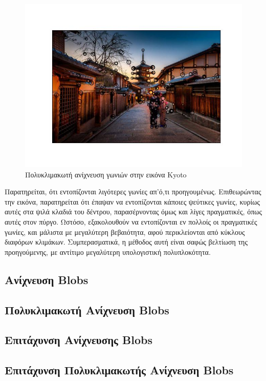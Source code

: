 \documentclass{article}
\newcommand{\eng}[1]{\foreignlanguage{english}{#1}}
\begin{document}
\begin{figure}[h]
    \centering
    \includegraphics[width=\textwidth]{image-plots/corner-detection-multiscale.jpg}
    \caption{Πολυκλιμακωτή ανίχνευση γωνιών στην εικόνα \eng{Kyoto}}
    \label{fig:kyoto-corners-multiscale}
\end{figure}
\FloatBarrier

Παρατηρείται, ότι εντοπίζονται λιγότερες γωνίες απ'ό,τι προηγουμένως. Επιθεωρώντας την εικόνα, παρατηρείται ότι έπαψαν να εντοπίζονται κάποιες ψεύτικες γωνίες, κυρίως αυτές στα ψιλά κλαδιά του δέντρου, παρασέρνοντας όμως και λίγες πραγματικές, όπως αυτές στον πύργο. Ωστόσο, εξακολουθούν να εντοπίζονται εν πολλοίς οι πραγματικές γωνίες, και μάλιστα με μεγαλύτερη βεβαιότητα, αφού περικλείονται από κύκλους διαφόρων κλιμάκων. Συμπερασματικά, η μέθοδος αυτή είναι σαφώς βελτίωση της προηγούμενης, με αντίτιμο μεγαλύτερη υπολογιστική πολυπλοκότητα.


\subsection{Ανίχνευση \eng{Blobs}}

\subsection{Πολυκλιμακωτή Ανίχνευση \eng{Blobs}}

\subsection{Επιτάχυνση Ανίχνευσης \eng{Blobs}}

\subsection{Επιτάχυνση Πολυκλιμακωτής Ανίχνευση \eng{Blobs}}
\end{document}

